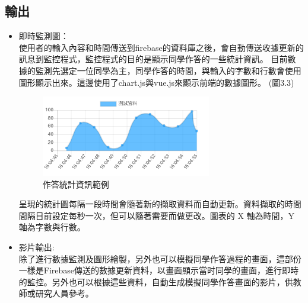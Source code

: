 \subsection{輸出}
\begin{itemize}
	\item 即時監測圖：\\
	使用者的輸入內容和時間傳送到firebase的資料庫之後，會自動傳送收據更新的訊息到監控程式，監控程式的目的是顯示同學作答的一些統計資訊。
	目前數據的監測先選定一位同學為主，同學作答的時間，與輸入的字數和行數會使用圖形顯示出來。這邊使用了chart.js與vue.js來顯示前端的數據圖形。
	(圖3.3)
	\begin{figure}[H] %
		\centering %
		\includegraphics[width=0.7\textwidth]{3.png} %
		\caption{作答統計資訊範例} %
		\label{Fig.3.3} %
	\end{figure}
呈現的統計圖每隔一段時間會隨著新的擷取資料而自動更新。資料擷取的時間間隔目前設定每秒一次，但可以隨著需要而做更改。圖表的 X 軸為時間，Y 軸為字數與行數。\\
	\item 影片輸出:\\
	除了進行數據監測及圖形繪製，另外也可以模擬同學作答過程的畫面，這部份一樣是Firebase傳送的數據更新資料，以畫面顯示當时同學的畫面，進行即時的監控。另外也可以根據這些資料，自動生成模擬同學作答畫面的影片，供教師或研究人員參考。
\end{itemize}

